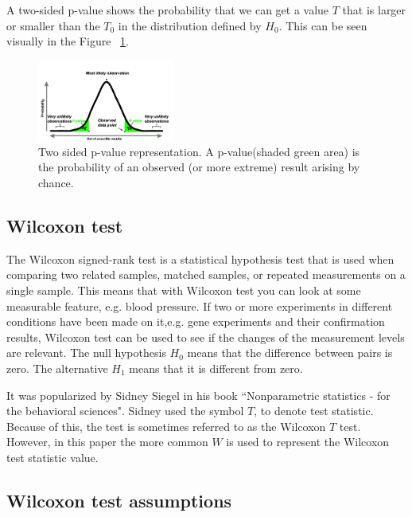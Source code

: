 \documentclass[12pt]{article}
\begin{document}
{A two-sided p-value shows the probability that we can get a value $T$ that is larger or smaller than the $T_0$ in the distribution defined by $H_0$. This can be seen visually in the Figure ~\ref{fig:p_value_two_sided}.

\begin{figure}[H]
  \centering
  \includegraphics[width=0.4\textwidth]{p_value_two_sided}
  \caption{Two sided p-value representation. A p-value(shaded green area) is the probability of an observed (or more extreme) result arising by chance. ~\cite{p_value_pic_cite}}
  \label{fig:p_value_two_sided}
\end{figure}

\subsection{Wilcoxon test}

The Wilcoxon signed-rank test is a statistical hypothesis test that is used when comparing two related samples, matched samples, or repeated measurements on a single sample. This means that with Wilcoxon test you can look at some measurable feature, e.g. blood pressure. If two or more experiments in different conditions have been made on it,e.g. gene experiments and their confirmation results, Wilcoxon test can be used to see if the changes of the measurement levels are relevant. The null hypothesis $H_0$ means that the difference between pairs is zero. The alternative $H_1$ means that it is different from zero.

It was popularized by Sidney Siegel in his book ``Nonparametric statistics - for the behavioral sciences". Sidney used the symbol $T$, to denote test statistic. Because of this, the test is sometimes referred to as the Wilcoxon $T$ test. However, in this paper the more common $W$ is used to represent the Wilcoxon test statistic value.

\subsection{Wilcoxon test assumptions}

}
\end{document}
